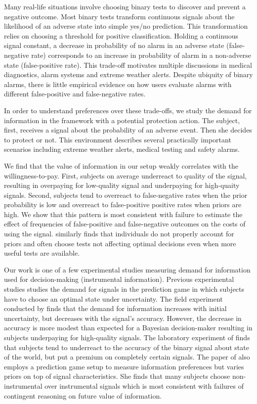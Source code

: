 \documentclass[12pt,a4paper]{article}
\begin{document}
Many real-life situations involve choosing binary tests to discover and prevent a negative outcome. Most binary tests transform continuous signals about the likelihood of an adverse state into simple yes/no prediction. This transformation relies on choosing a threshold for positive classification. Holding a continuous signal constant, a decrease in probability of no alarm in an adverse state (false-negative rate) corresponds to an increase in probability of alarm in a non-adverse state (false-positive rate). This trade-off motivates multiple discussions in medical diagnostics, alarm systems and extreme weather alerts. Despite ubiquity of binary alarms, there is little empirical evidence on how users evaluate alarms with different false-positive and false-negative rates. 

In order to understand preferences over these trade-offs, we study the demand for information in the framework with a potential protection action. The subject, first, receives a signal about the probability of an adverse event. Then she decides to protect or not. This environment describes several practically important scenarios including extreme weather alerts, medical testing and safety alarms. 

We find that the value of information in our setup weakly correlates with the willingness-to-pay. First, subjects on average underreact to quality of the signal, resulting in overpaying for low-quality signal and underpaying for high-quaity signals. Second, subjects tend to overreact to false-negative rates when the prior probability is low and overreact to false-positive positive rates when priors are high. We show that this pattern is most consistent with failure to estimate the effect of frequencies of false-positive and false-negative outcomes on the costs of using the signal. \citep{xu_revealed_2022} similarly finds that individuals do not properly account for priors and often choose tests not affecting optimal decisions even when more useful tests are available.

Our work is one of a few experimental studies measuring demand for information used for decision-making (instrumental information). Previous experimental studies studies the demand for signals in the prediction game in which subjects have to choose an optimal state under uncertainty. The field experiment conducted by \citep{hoffman_how_2016} finds that the demand for information increases with initial uncertainty, but decreases with the signal's accuracy. However, the decrease in accuracy is more modest than expected for a Bayesian decision-maker resulting in subjects underpaying for high-quality signals. The laboratory experiment of \citet{ambuehl_belief_2018} finds that subjects tend to underreact to the accuracy of the binary signal about state of the world, but put a premium on completely certain signals. The paper of \citet{xu_revealed_2022} also employs a prediction game setup to measure information preferences but varies priors on top of signal characteristics. She finds that many subjects choose non-instrumental over instrumental signals which is most consistent with failures of contingent reasoning on future value of information.
\end{document}
